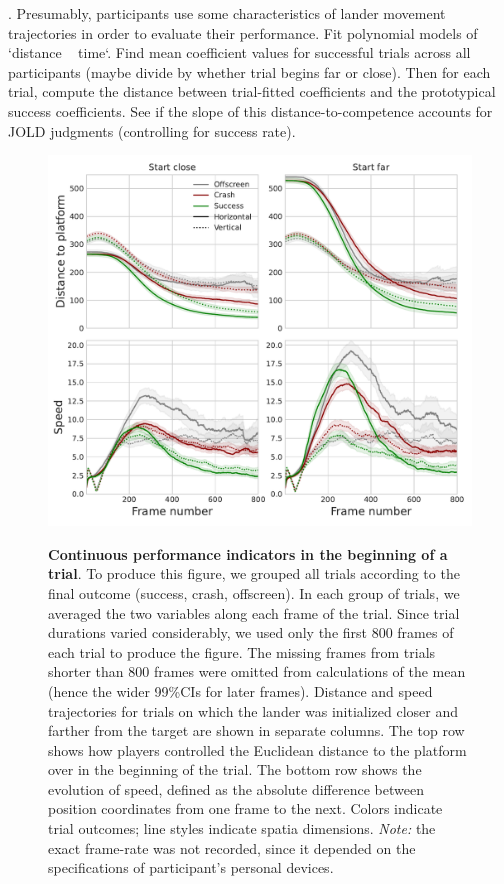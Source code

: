 . Presumably, participants use some characteristics of lander movement trajectories in order to evaluate their performance. 
Fit polynomial models of `distance ~ time`. Find mean coefficient values for successful trials across all participants (maybe divide by whether trial begins far or close). Then for each trial, compute the distance between trial-fitted coefficients and the prototypical success coefficients. See if the slope of this distance-to-competence accounts for JOLD judgments (controlling for success rate).

\begin{figure}[bth]
    \centering
    {\includegraphics[width=\linewidth]{Figures/c5/dist_speed_start_800_CI99.pdf}}
    \caption[]{\textbf{Continuous performance indicators in the beginning of a trial}. To produce this figure, we grouped all trials according to the final outcome (success, crash, offscreen). In each group of trials, we averaged the two variables along each frame of the trial. Since trial durations varied considerably, we used only the first 800 frames of each trial to produce the figure. The missing frames from trials shorter than 800 frames were omitted from calculations of the mean (hence the wider 99\%\acp{CI} for later frames). Distance and speed trajectories for trials on which the lander was initialized closer and farther from the target are shown in separate columns. The top row shows how players controlled the Euclidean distance to the platform over in the beginning of the trial. The bottom row shows the evolution of speed, defined as the absolute difference between position coordinates from one frame to the next. Colors indicate trial outcomes; line styles indicate spatia dimensions. \textit{Note:} the exact frame-rate was not recorded, since it depended on the specifications of participant's personal devices.}\label{fig:5-dist_speed_start_800_CI99}
\end{figure}


